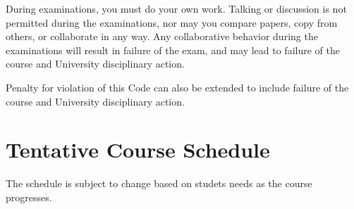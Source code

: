\documentclass[a4paper]{article}
\begin{document}
During examinations, you must do your own work. Talking or discussion is not permitted during the examinations, nor may you compare papers, copy from others, or collaborate in any way. Any collaborative behavior during the examinations will result in failure of the exam, and may lead to failure of the course and University disciplinary action.

Penalty for violation of this Code can also be extended to include failure of the course and University disciplinary action. 

\thispagestyle{empty}
\section{Tentative Course Schedule}

The schedule is subject to change based on studets needs as the course progresses.
\end{document}
